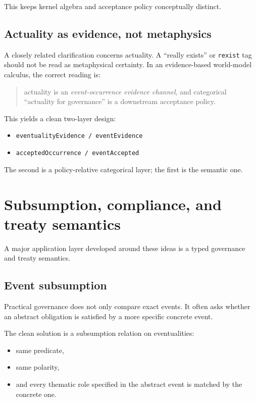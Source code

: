 \documentclass[11pt]{article}
\begin{document}
This keeps kernel algebra and acceptance policy conceptually distinct.

\subsection{Actuality as evidence, not metaphysics}

A closely related clarification concerns actuality.  A ``really exists'' or
\texttt{rexist} tag should not be read as metaphysical certainty.  In an
evidence-based world-model calculus, the correct reading is:
\begin{quote}
actuality is an \emph{event-occurrence evidence channel}, and categorical
``actuality for governance'' is a downstream acceptance policy.
\end{quote}

This yields a clean two-layer design:
\begin{itemize}
  \item \texttt{eventualityEvidence / eventEvidence}
  \item \texttt{acceptedOccurrence / eventAccepted}
\end{itemize}

The second is a policy-relative categorical layer; the first is the semantic
one.

\section{Subsumption, compliance, and treaty semantics}

A major application layer developed around these ideas is a typed governance and
treaty semantics.

\subsection{Event subsumption}

Practical governance does not only compare exact events.  It often asks whether
an abstract obligation is satisfied by a more specific concrete event.

The clean solution is a subsumption relation on eventualities:
\begin{itemize}
  \item same predicate,
  \item same polarity,
  \item and every thematic role specified in the abstract event is matched by
        the concrete one.
\end{itemize}
\end{document}
